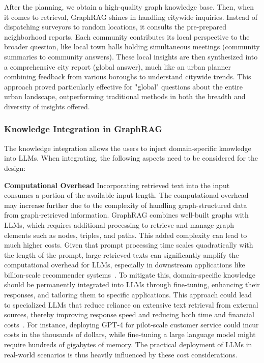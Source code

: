 \documentclass[lettersize,journal]{IEEEtran}
\begin{document}
After the planning, we obtain a high-quality graph knowledge base. Then, when it comes to retrieval, GraphRAG shines in handling citywide inquiries. Instead of dispatching surveyors to random locations, it consults the pre-prepared neighborhood reports. Each community contributes its local perspective to the broader question, like local town halls holding simultaneous meetings (community summaries to community answers). These local insights are then synthesized into a comprehensive city report (global answer), much like an urban planner combining feedback from various boroughs to understand citywide trends. This approach proved particularly effective for "global" questions about the entire urban landscape, outperforming traditional methods in both the breadth and diversity of insights offered.

\subsubsection{Knowledge Integration in GraphRAG}

The knowledge integration allows the users to inject domain-specific knowledge into LLMs. When integrating, the following aspects need to be considered for the design:

\noindent\textbf{Computational Overhead} Incorporating retrieved text into the input consumes a portion of the available input length. The computational overhead may increase further due to the complexity of handling graph-structured data from graph-retrieved information. GraphRAG combines well-built graphs with LLMs, which requires additional processing to retrieve and manage graph elements such as nodes, triples, and paths. This added complexity can lead to much higher costs.
Given that prompt processing time scales quadratically with the length of the prompt, large retrieved texts can significantly amplify the computational overhead for LLMs, especially in downstream applications like billion-scale recommender systems~\cite{wang2024llms,kim2024large}. To mitigate this, domain-specific knowledge should be permanently integrated into LLMs through fine-tuning, enhancing their responses, and tailoring them to specific applications. This approach could lead to specialized LLMs that reduce reliance on extensive text retrieval from external sources, thereby improving response speed and reducing both time and financial costs~\cite{xia2024understanding,sun2024cebench}. For instance, deploying GPT-4 for pilot-scale customer service could incur costs in the thousands of dollars, while fine-tuning a large language model might require hundreds of gigabytes of memory. The practical deployment of LLMs in real-world scenarios is thus heavily influenced by these cost considerations. 
\end{document}
